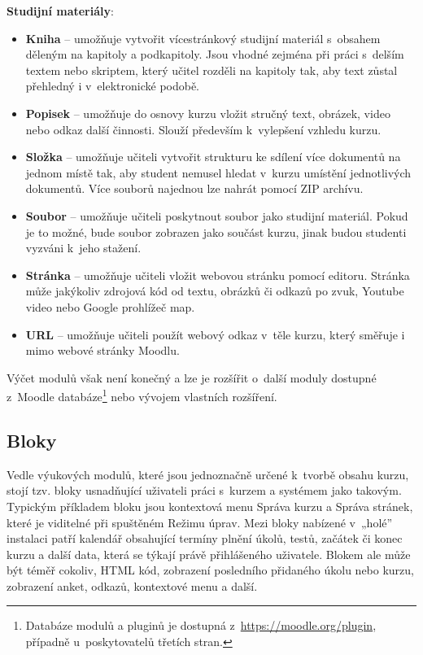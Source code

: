 \documentclass[
print,
  11pt,
  table,   
  nolof,    
  nolot,
  oneside,final
]{fithesis3}
\begin{document}
\textbf{Studijní materiály}:
\begin{itemize}
\item \textbf{Kniha} -- umožňuje vytvořit vícestránkový studijní materiál s~obsahem děleným na kapitoly a podkapitoly.  Jsou vhodné zejména při práci s~delším textem nebo skriptem, který učitel rozděli na kapitoly tak, aby text zůstal přehledný i v~elektronické podobě.
\item \textbf{Popisek} -- umožňuje do osnovy kurzu vložit stručný text, obrázek, video nebo odkaz další činnosti. Slouží především k~vylepšení vzhledu kurzu.
\item \textbf{Složka} -- umožňuje učiteli vytvořit strukturu ke sdílení více dokumentů na jednom místě tak, aby student nemusel hledat v~kurzu umístění jednotlivých dokumentů. Více souborů najednou lze nahrát pomocí ZIP archívu.
\item \textbf{Soubor} -- umožňuje učiteli poskytnout soubor jako studijní materiál. Pokud je to možné, bude soubor zobrazen jako součást kurzu, jinak budou studenti vyzváni k~jeho stažení.
\item \textbf{Stránka} -- umožňuje učiteli vložit webovou stránku pomocí editoru. Stránka může jakýkoliv zdrojová kód  od textu, obrázků či odkazů po zvuk, Youtube video nebo Google prohlížeč map.
\item \textbf{URL} -- umožňuje učiteli použít webový odkaz v~těle kurzu, který směřuje i mimo web\-ové stránky Moodlu.
\end{itemize}
Výčet modulů však není konečný a lze je rozšířit o~další moduly dostupné z~Moodle databáze\footnote{Databáze modulů a pluginů je dostupná z~\url{https://moodle.org/plugin}, případně u~poskytovatelů třetích stran.} nebo vývojem vlastních rozšíření.

		\subsection{Bloky}
Vedle výukových modulů, které jsou jednoznačně určené k~tvorbě obsahu kurzu, stojí tzv. bloky usnadňující uživateli práci s~kurzem a systémem jako takovým. Typickým příkladem bloku jsou kontextová menu Správa kurzu a Správa stránek, které je viditelné při spuštěném Režimu úprav. Mezi bloky nabízené v~„holé” instalaci patří kalendář obsahující termíny plnění úkolů, testů, začátek či konec kurzu a další data, která se týkají právě přihlášeného uživatele. Blokem ale může být téměř cokoliv, HTML kód, zobrazení posledního přidaného úkolu nebo kurzu, zobrazení anket, odkazů, kontextové menu a další.
\end{document}
